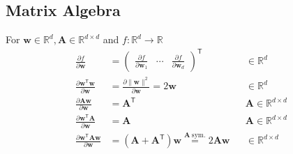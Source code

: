 \subsection{Matrix Algebra}
For $\mathbf{w}\in \mathbb{R}^d, \mathbf{A}\in \mathbb{R}^{d\times d}$ and $ f: \mathbb{R}^d\to \mathbb{R}$
\noindent\begin{align*}
    \frac{\partial f}{\partial \mathbf{w}}                                                                                             & =
    \begin{pmatrix}\frac{\partial f}{\partial \mathbf{w}_1} & \cdots & \frac{\partial f}{\partial \mathbf{w}_d}
    \end{pmatrix}^{\mathsf{T}} &                                                                                                                 & \in \mathbb{R}^d                                                                                                                                                \\[1em]
    \frac{\partial \mathbf{w}^{\mathsf{T}}\mathbf{w}}{\partial \mathbf{w}}                                                             & =\frac{\partial\|\mathbf{w}\|^2}{\partial \mathbf{w}}=2\mathbf{w}                                               &                  & \in \mathbb{R}^d                     \\
    \frac{\partial \mathbf{A}\mathbf{w}}{\partial \mathbf{w}}                                                                          & ={\mathbf{A}}^{\mathsf{T}}                                                                                      &                  & \mathbf{A}\in \mathbb{R}^{d\times d} \\
    \frac{\partial \mathbf{w}^{\mathsf{T}}\mathbf{A}}{\partial \mathbf{w}}                                                             & = \mathbf{A}                                                                                                    &                  & \mathbf{A}\in \mathbb{R}^{d\times d} \\
    \frac{\partial \mathbf{w}^{\mathsf{T}}\mathbf{Aw}}{\partial \mathbf{w}}                                                            & = \left(\mathbf{A}+\mathbf{A}^{\mathsf{T}}\right)\mathbf{w} \overset{\mathbf{A}\ \mathrm{sym.}}{=} 2\mathbf{Aw} &                  & \in \mathbb{R}^{d\times d}
\end{align*}

